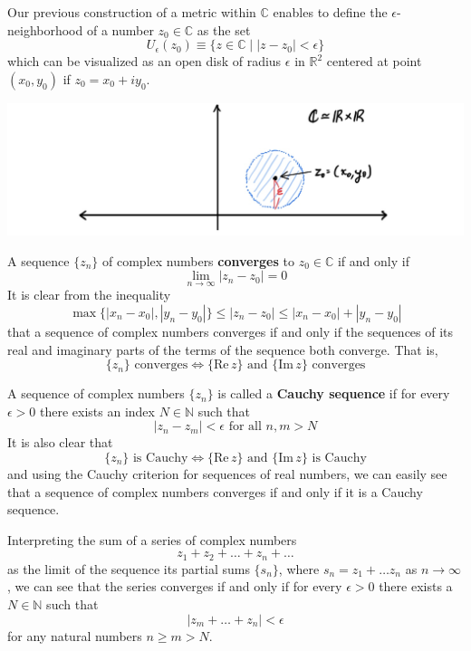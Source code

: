 \documentclass{article}
\begin{document}
  Our previous construction of a metric within $\mathbb{C}$ enables to define the $\epsilon$-neighborhood of a number $z_0 \in \mathbb{C}$ as the set
  \[U_\epsilon (z_0) \equiv \{z \in \mathbb{C}\;|\; |z - z_0| < \epsilon\}\]
  which can be visualized as an open disk of radius $\epsilon$ in $\mathbb{R}^2$ centered at point $(x_0, y_0)$ if $z_0 = x_0 + i y_0$. 
  \begin{center}
      \includegraphics[scale=0.25]{img/Epsilon_Neighborhood_in_C.jpg}
  \end{center}

  \begin{definition}
    A sequence $\{z_n\}$ of complex numbers \textbf{converges} to $z_0 \in \mathbb{C}$ if and only if 
    \[\lim_{n \rightarrow \infty} |z_n - z_0| = 0\]
    It is clear from the inequality
    \[\max\{|x_n - x_0|, |y_n - y_0|\} \leq |z_n - z_0| \leq |x_n - x_0| + |y_n - y_0|\]
    that a sequence of complex numbers converges if and only if the sequences of its real and imaginary parts of the terms of the sequence both converge. That is, 
    \[\{z_n\} \text{ converges} \iff \{\text{Re}\,z\} \text{ and } \{\text{Im}\,z\} \text{ converges}\]
  \end{definition}

  \begin{lemma}
    A sequence of complex numbers $\{z_n\}$ is called a \textbf{Cauchy sequence} if for every $\epsilon>0$ there exists an index $N \in \mathbb{N}$ such that
    \[|z_n - z_m|<\epsilon \text{ for all } n, m > N\]
    It is also clear that 
    \[\{z_n\} \text{ is Cauchy} \iff \{\text{Re}\,z\} \text{ and } \{\text{Im}\,z\} \text{ is Cauchy}\]
    and using the Cauchy criterion for sequences of real numbers, we can easily see that a sequence of complex numbers converges if and only if it is a Cauchy sequence. 
  \end{lemma}

  \begin{lemma}
    Interpreting the sum of a series of complex numbers
    \[z_1 + z_2 + \ldots + z_n + \ldots\]
    as the limit of the sequence its partial sums $\{s_n\}$, where $s_n = z_1 + \ldots z_n$ as $n \rightarrow \infty$, we can see that the series converges if and only if for every $\epsilon > 0$ there exists a $N \in \mathbb{N}$ such that 
    \[|z_m + \ldots + z_n| < \epsilon\]
    for any natural numbers $n \geq m > N$. 
  \end{lemma}
\end{document}

